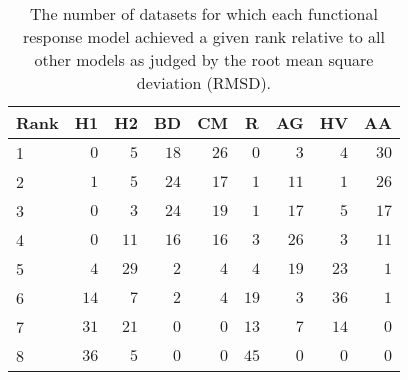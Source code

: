 \begin{table}[!tbp]
\caption{The number of datasets for which each functional response model achieved a given rank relative to all other models as judged by the root mean square deviation (RMSD).\label{table:RMSD_rankings}} 
\begin{center}
\begin{tabular}{lrrrrrrrr}
\hline\hline
\multicolumn{1}{l}{Rank}&\multicolumn{1}{c}{H1}&\multicolumn{1}{c}{H2}&\multicolumn{1}{c}{BD}&\multicolumn{1}{c}{CM}&\multicolumn{1}{c}{R}&\multicolumn{1}{c}{AG}&\multicolumn{1}{c}{HV}&\multicolumn{1}{c}{AA}\tabularnewline
\hline
1&$ 0$&$ 5$&$18$&$26$&$ 0$&$ 3$&$ 4$&$30$\tabularnewline
2&$ 1$&$ 5$&$24$&$17$&$ 1$&$11$&$ 1$&$26$\tabularnewline
3&$ 0$&$ 3$&$24$&$19$&$ 1$&$17$&$ 5$&$17$\tabularnewline
4&$ 0$&$11$&$16$&$16$&$ 3$&$26$&$ 3$&$11$\tabularnewline
5&$ 4$&$29$&$ 2$&$ 4$&$ 4$&$19$&$23$&$ 1$\tabularnewline
6&$14$&$ 7$&$ 2$&$ 4$&$19$&$ 3$&$36$&$ 1$\tabularnewline
7&$31$&$21$&$ 0$&$ 0$&$13$&$ 7$&$14$&$ 0$\tabularnewline
8&$36$&$ 5$&$ 0$&$ 0$&$45$&$ 0$&$ 0$&$ 0$\tabularnewline
\hline
\end{tabular}\end{center}
\end{table}
